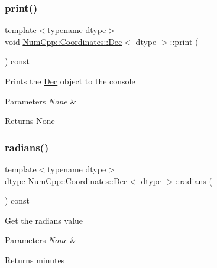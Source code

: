 \subsubsection{\texorpdfstring{print()}{print()}}
{\footnotesize\ttfamily template$<$typename dtype$>$ \\
void \mbox{\hyperlink{class_num_cpp_1_1_coordinates_1_1_dec}{Num\+Cpp\+::\+Coordinates\+::\+Dec}}$<$ dtype $>$\+::print (\begin{DoxyParamCaption}{ }\end{DoxyParamCaption}) const\hspace{0.3cm}{\ttfamily [inline]}}

Prints the \mbox{\hyperlink{class_num_cpp_1_1_coordinates_1_1_dec}{Dec}} object to the console


\begin{DoxyParams}{Parameters}
{\em None} & \\
\hline
\end{DoxyParams}
\begin{DoxyReturn}{Returns}
None 
\end{DoxyReturn}
\mbox{\label{class_num_cpp_1_1_coordinates_1_1_dec_ad4bc900f3a4b2a29089a76d72fe04053}} 
\subsubsection{\texorpdfstring{radians()}{radians()}}
{\footnotesize\ttfamily template$<$typename dtype$>$ \\
dtype \mbox{\hyperlink{class_num_cpp_1_1_coordinates_1_1_dec}{Num\+Cpp\+::\+Coordinates\+::\+Dec}}$<$ dtype $>$\+::radians (\begin{DoxyParamCaption}{ }\end{DoxyParamCaption}) const\hspace{0.3cm}{\ttfamily [inline]}}

Get the radians value


\begin{DoxyParams}{Parameters}
{\em None} & \\
\hline
\end{DoxyParams}
\begin{DoxyReturn}{Returns}
minutes 
\end{DoxyReturn}
\mbox{\label{class_num_cpp_1_1_coordinates_1_1_dec_a7097ca352bfd8bd25b42f06feeece857}} 
